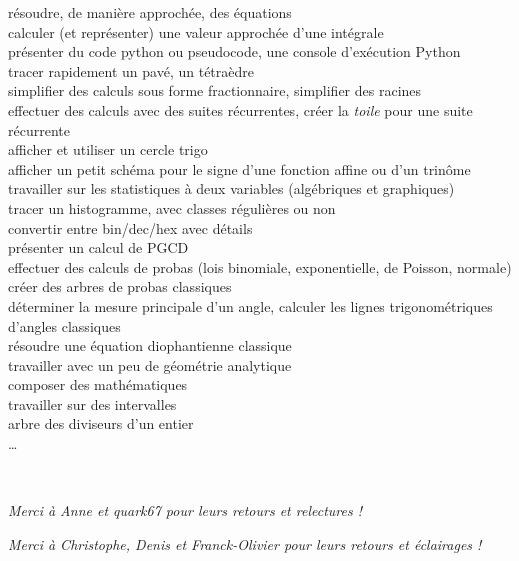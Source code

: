 {\footnotesize\noindent%
	{\deblst} résoudre, de manière approchée, des équations\\
	{\deblst} calculer (et représenter) une valeur approchée d'une intégrale\\
	{\deblst} présenter du code \textsf{python} ou \textsf{pseudocode}, une console d'exécution \textsf{Python} \\
	{\deblst} tracer rapidement un pavé, un tétraèdre \\
	{\deblst} simplifier des calculs sous forme fractionnaire, simplifier des racines \\
	{\deblst} effectuer des calculs avec des suites récurrentes, créer la \textit{toile} pour une suite récurrente \\
	{\deblst} afficher et utiliser un cercle trigo \\
	{\deblst} afficher un petit schéma pour le signe d'une fonction affine ou d'un trinôme \\
	{\deblst} travailler sur les statistiques à deux variables (algébriques et graphiques) \\
	{\deblst} tracer un histogramme, avec classes régulières ou non \\
	{\deblst} convertir entre bin/dec/hex avec détails \\
	{\deblst} présenter un calcul de PGCD \\
	{\deblst} effectuer des calculs de probas (lois binomiale, exponentielle, de Poisson, normale) \\
	{\deblst} créer des arbres de probas \og classiques \fg \\
	{\deblst} déterminer la mesure principale d'un angle, calculer les lignes trigonométriques d'angles \og classiques \fg{} \\
	{\deblst} résoudre une équation diophantienne \og classique \fg{} \\
	{\deblst} travailler avec un peu de géométrie analytique \\
	{\deblst} composer des mathématiques\\
	{\deblst} travailler sur des intervalles\\
	{\deblst} arbre des diviseurs d'un entier\\
	{\deblst} \ldots
}

~

\hfill{}\textsl{Merci à Anne et quark67 pour leurs retours et relectures !}

\hfill{}\textsl{Merci à Christophe, Denis et Franck-Olivier pour leurs retours et éclairages !}

